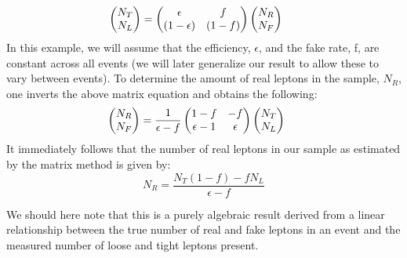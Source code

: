 \begin{equation}
  \label{eqn:single_lepton_matrix_standard}
  \hspace{-0.5cm}
  \begin{pmatrix}
    N_{T}\\
    N_{L} \\
  \end{pmatrix} 
  = 
  \begin{pmatrix}
    \epsilon & f \\
    (1-\epsilon) & (1-f) \\
  \end{pmatrix}
  \begin{pmatrix}
    N_{R} \\
    N_{F} \\
  \end{pmatrix}
\end{equation}
In this example, we will assume that the efficiency, $\epsilon$, and the fake rate, f, are constant across all events (we will later generalize our result to allow these to vary between events).
To determine the amount of real leptons in the sample, $N_{R}$, one inverts the above matrix equation and obtains the following:
\begin{equation}
  \label{eqn:single_lepton_matrix_standard_inverted}
  \hspace{-0.5cm}
  \begin{pmatrix}
    N_{R}\\
    N_{F} \\
  \end{pmatrix} 
  = \frac{1}{\epsilon - f}
  \begin{pmatrix}
    1-f & -f \\
    \epsilon-1 & \epsilon \\
  \end{pmatrix}
  \begin{pmatrix}
    N_{T} \\
    N_{L} \\
  \end{pmatrix}
\end{equation}
It immediately follows that the number of real leptons in our sample as estimated by the matrix method is given by:
\begin{equation}
  \label{eqn:single_lepton_matrix_standard_num_real}
  N_{R} = \frac{N_T(1-f) - f N_L}{\epsilon - f}
\end{equation}

We should here note that this is a purely algebraic result derived from a linear relationship
between the true number of real and fake leptons in an event and the measured number of loose
and tight leptons present.



